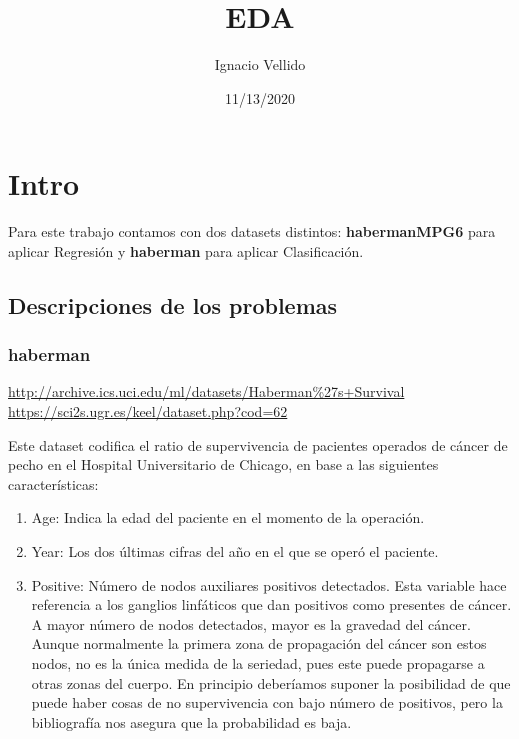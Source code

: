 \documentclass[
]{article}
\title{EDA}
\author{Ignacio Vellido}
\date{11/13/2020}
\providecommand{\tightlist}{%
  \setlength{\itemsep}{0pt}\setlength{\parskip}{0pt}}
\begin{document}
\maketitle

\hypertarget{intro}{%
\section{Intro}\label{intro}}

Para este trabajo contamos con dos datasets distintos:
\textbf{habermanMPG6} para aplicar Regresión y \textbf{haberman} para
aplicar Clasificación.

\hypertarget{descripciones-de-los-problemas}{%
\subsection{Descripciones de los
problemas}\label{descripciones-de-los-problemas}}

\hypertarget{haberman}{%
\subsubsection{haberman}\label{haberman}}

\url{http://archive.ics.uci.edu/ml/datasets/Haberman\%27s+Survival}
\url{https://sci2s.ugr.es/keel/dataset.php?cod=62}

Este dataset codifica el ratio de supervivencia de pacientes operados de
cáncer de pecho en el Hospital Universitario de Chicago, en base a las
siguientes características:

\begin{enumerate}
\def\labelenumi{\arabic{enumi}.}
\tightlist
\item
  Age: Indica la edad del paciente en el momento de la operación.
\item
  Year: Los dos últimas cifras del año en el que se operó el paciente.
\item
  Positive: Número de nodos auxiliares positivos detectados. Esta
  variable hace referencia a los ganglios linfáticos que dan positivos
  como presentes de cáncer. A mayor número de nodos detectados, mayor es
  la gravedad del cáncer. Aunque normalmente la primera zona de
  propagación del cáncer son estos nodos, no es la única medida de la
  seriedad, pues este puede propagarse a otras zonas del cuerpo. En
  principio deberíamos suponer la posibilidad de que puede haber cosas
  de no supervivencia con bajo número de positivos, pero la bibliografía
  nos asegura que la probabilidad es baja.
\end{enumerate}
\end{document}
